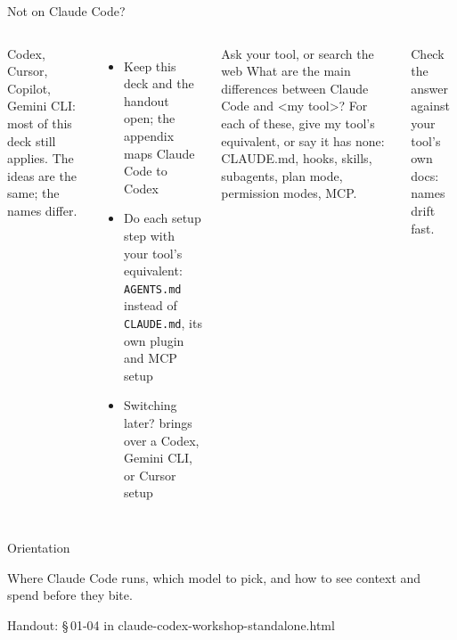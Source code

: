 \documentclass[aspectratio=169,11pt,t]{beamer}
\newcommand{\partframe}[4]{%
  \setsec{}%
  \begin{frame}[c]
    \lbl{Part #1}\par\vspace{0.5em}
    {\seriffamily\fontsize{40}{42}\selectfont #2}\par\vspace{0.8em}
    \begin{minipage}{0.8\textwidth}\raggedright\color{muted}#4\end{minipage}\par\vspace{1.4em}
    {\ttfamily\scriptsize\color{dim}Handout: \S\,#3 in claude-codex-workshop-standalone.html}
  \end{frame}}
\begin{document}
\begin{frame}{Not on Claude Code?}
  \begin{columns}[T,onlytextwidth]
      \small Codex, Cursor, Copilot, Gemini CLI: most of this deck still applies. The ideas are the same; the names differ.
      \begin{itemize}\setlength\itemsep{0.3em}
        \item Keep this deck and the handout open; the appendix maps Claude Code to Codex
        \item Do each setup step with your tool's equivalent: \texttt{AGENTS.md} instead of \texttt{CLAUDE.md}, its own plugin and MCP setup
        \item Switching later?  brings over a Codex, Gemini CLI, or Cursor setup
      \end{itemize}
      \begin{callout}[good]{Ask your tool, or search the web}
        What are the main differences between Claude Code and <my tool>? For each of these, give my tool's equivalent, or say it has none: CLAUDE.md, hooks, skills, subagents, plan mode, permission modes, MCP.
      \end{callout}
      {\footnotesize\color{muted}Check the answer against your tool's own docs: names drift fast.}
  \end{columns}
\end{frame}

\partframe{I}{Orientation}{01-04}{Where Claude Code runs, which model to pick, and how to see context and spend before they bite.}
\end{document}
